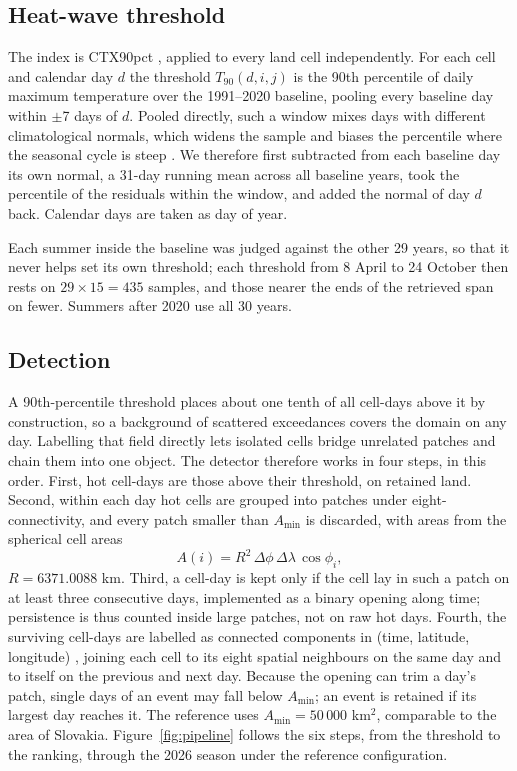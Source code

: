 \documentclass{amsdraft}
\begin{document}
\subsection{Heat-wave threshold}
\label{sec:index}

The index is CTX90pct \citep{PerkinsAlexander2013}, applied to every land
cell independently. For each cell and calendar day $d$ the threshold
$T_{90}(d,i,j)$ is the 90th percentile of daily maximum temperature over the
1991--2020 baseline, pooling every baseline day within $\pm$7 days of $d$.
Pooled directly, such a window mixes days with different climatological
normals, which widens the sample and biases the percentile where the
seasonal cycle is steep \citep{BrunnerVoigt2024}. We therefore first
subtracted from each baseline day its own normal, a 31-day running mean
across all baseline years, took the percentile of the residuals within the
window, and added the normal of day $d$ back. Calendar days are taken as
day of year.

Each summer inside the baseline was judged against the other 29 years, so
that it never helps set its own threshold; each threshold from 8 April to
24 October then rests on $29 \times 15 = 435$ samples, and those nearer the
ends of the retrieved span on fewer. Summers after 2020 use all 30 years.

\subsection{Detection}
\label{sec:coherence}

A 90th-percentile threshold places about one tenth of all cell-days above it
by construction, so a background of scattered exceedances covers the domain
on any day. Labelling that field directly lets isolated cells bridge
unrelated patches and chain them into one object. The detector therefore
works in four steps, in this order. First, hot cell-days are those above
their threshold, on retained land. Second, within each day hot cells are
grouped into patches under eight-connectivity, and every patch smaller than
$A_{\min}$ is discarded, with areas from the spherical cell areas
\begin{equation}
A(i) = R^2 \, \Delta\phi \, \Delta\lambda \, \cos\phi_i ,
\label{eq:area}
\end{equation}
$R = 6371.0088$ km. Third, a cell-day is kept only if the cell lay in such a
patch on at least three consecutive days, implemented as a binary opening
along time; persistence is thus counted inside large patches, not on raw hot
days. Fourth, the surviving cell-days are labelled as connected components
in (time, latitude, longitude) \citep{Virtanen2020}, joining each cell to its
eight spatial neighbours on the same day and to itself on the previous and
next day. Because the opening can trim a day's patch, single days of an event
may fall below $A_{\min}$; an event is retained if its largest day reaches it.
The reference uses $A_{\min} = 50\,000$ km$^2$, comparable to the area of
Slovakia.
Figure~\ref{fig:pipeline} follows the six steps, from the threshold to the
ranking, through the 2026 season under the reference configuration.
\end{document}
